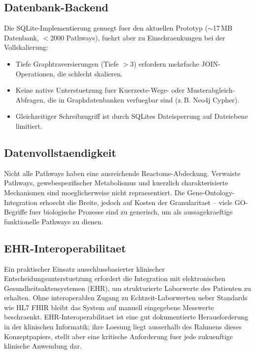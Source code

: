 \documentclass[12pt,a4paper]{article}
\begin{document}
\subsection*{Datenbank-Backend}

Die SQLite-Implementierung genuegt fuer den aktuellen Prototyp ($\sim$17\,MB Datenbank, $<$2000 Pathways), fuehrt aber zu Einschraenkungen bei der Vollskalierung:

\begin{itemize}
    \item Tiefe Graphtraversierungen (Tiefe $>3$) erfordern mehrfache JOIN-Operationen, die schlecht skalieren.
    \item Keine native Unterstuetzung fuer Kuerzeste-Wege- oder Musterabgleich-Abfragen, die in Graphdatenbanken verfuegbar sind (z.\,B. Neo4j Cypher).
    \item Gleichzeitiger Schreibzugriff ist durch SQLites Dateisperrung auf Dateiebene limitiert.
\end{itemize}

\subsection*{Datenvollstaendigkeit}

Nicht alle Pathways haben eine ausreichende Reactome-Abdeckung. Verwaiste Pathways, gewebespezifischer Metabolismus und kuerzlich charakterisierte Mechanismen sind moeglicherweise nicht repraesentiert. Die Gene-Ontology-Integration erhoecht die Breite, jedoch auf Kosten der Granularitaet -- viele GO-Begriffe fuer biologische Prozesse sind zu generisch, um als aussagekraeftige funktionelle Pathways zu dienen.

\subsection*{EHR-Interoperabilitaet}

Ein praktischer Einsatz ausschlussbasierter klinischer Entscheidungsunterstuetzung erfordert die Integration mit elektronischen Gesundheitsaktensystemen (EHR), um strukturierte Laborwerte des Patienten zu erhalten. Ohne interoperablen Zugang zu Echtzeit-Laborwerten ueber Standards wie HL7 FHIR bleibt das System auf manuell eingegebene Messwerte beschraenkt. EHR-Interoperabilitaet ist eine gut dokumentierte Herausforderung in der klinischen Informatik; ihre Loesung liegt ausserhalb des Rahmens dieses Konzeptpapiers, stellt aber eine kritische Anforderung fuer jede zukuenftige klinische Anwendung dar.
\end{document}

